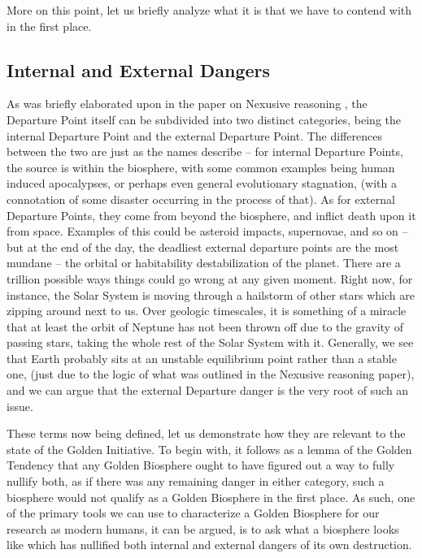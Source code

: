 More on this point, let us briefly analyze what it is that we have to contend with in the first place.

\subsection{Internal and External Dangers}

As was briefly elaborated upon in the paper on Nexusive reasoning \cite{Nexus}, the Departure Point itself can be subdivided into two distinct categories, being the internal Departure Point and the external Departure Point. The differences between the two are just as the names describe -- for internal Departure Points, the source is within the biosphere, with some common examples being human induced apocalypses, or perhaps even general evolutionary stagnation, (with a connotation of some disaster occurring in the process of that). As for external Departure Points, they come from beyond the biosphere, and inflict death upon it from space. Examples of this could be asteroid impacts, supernovae, and so on -- but at the end of the day, the deadliest external departure points are the most mundane -- the orbital or habitability destabilization of the planet. There are a trillion possible ways things could go wrong at any given moment. Right now, for instance, the Solar System is moving through a hailstorm of other stars which are zipping around next to us. Over geologic timescales, it is something of a miracle that at least the orbit of Neptune has not been thrown off due to the gravity of passing stars, taking the whole rest of the Solar System with it. Generally, we see that Earth probably sits at an unstable equilibrium point rather than a stable one, (just due to the logic of what was outlined in the Nexusive reasoning paper), and we can argue that the external Departure danger is the very root of such an issue. 

These terms now being defined, let us demonstrate how they are relevant to the state of the Golden Initiative. To begin with, it follows as a lemma of the Golden Tendency that any Golden Biosphere ought to have figured out a way to fully nullify both, as if there was any remaining danger in either category, such a biosphere would not qualify as a Golden Biosphere in the first place. As such, one of the primary tools we can use to characterize a Golden Biosphere for our research as modern humans, it can be argued, is to ask what a biosphere looks like which has nullified both internal and external dangers of its own destruction. 

